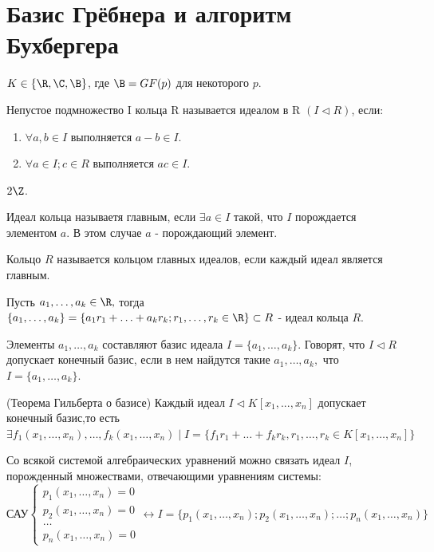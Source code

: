 \section {Базис Грёбнера и алгоритм Бухбергера}

$ K \in \{ \R, \C, \B \} $, где $\B = GF(p)$ для некоторого $p$.

\opr Непустое подмножество I кольца R называется идеалом в R $(I \triangleleft R)$, если:
\begin{enumerate}
	\item $\forall a,b \in I$ выполняется $a - b \in I$. 
	\item $\forall a \in I; c \in R$ выполняется $ac \in I$.
\end{enumerate}

\example $2\Z$.

\opr Идеал кольца называетя главным, если $\exists a \in I$ такой, что $I$ порождается элементом $a$. В этом случае $a$ - порождающий элемент.

\opr Кольцо $R$ называется кольцом главных идеалов, если каждый идеал является главным.

\utv Пусть $a_1,\ldots,a_k \in \R,$ тогда $\{a_1,\ldots,a_k\} = \{ a_1r_1+\ldots+a_kr_k; r_1,\ldots,r_k \in \R\} \subset R$ - идеал кольца $R$.

\opr Элементы $a_1,\ldots,a_k$ составляют базис идеала $I = \{a_1,\ldots,a_k\}.$ Говорят, что $I \triangleleft R$ допускает конечный базис, если в нем найдутся такие $a_1,\ldots,a_k,$ что $I = \{a_1,\ldots,a_k\}.$

\thr (Теорема Гильберта о базисе) Каждый идеал $I \triangleleft K[x_1,...,x_n]$ допускает конечный базис,то есть $\exists  f_1(x_1,\ldots,x_n),\ldots,f_k(x_1,\ldots,x_n) \mid I = \{ f_1r_1 + \ldots + f_kr_k, r_1,\ldots,r_k \in K[x_1,\ldots,x_n] \}$ 
\par
Со всякой системой алгебраических уравнений можно связать идеал $I$, порожденный множествами, отвечающими уравнениям системы:
\begin{equation*}
	\text{САУ}
	\begin{cases}
	   	p_1(x_1,\ldots,x_n) = 0\\
	   	p_2(x_1,\ldots,x_n) = 0\\
		\ldots\\
		p_n(x_1,\ldots,x_n) = 0
	\end{cases}
	\leftrightarrow I = \{p_1(x_1,\ldots,x_n);p_2(x_1,\ldots,x_n);\ldots;p_n(x_1,\ldots,x_n)\}
\end{equation*}

